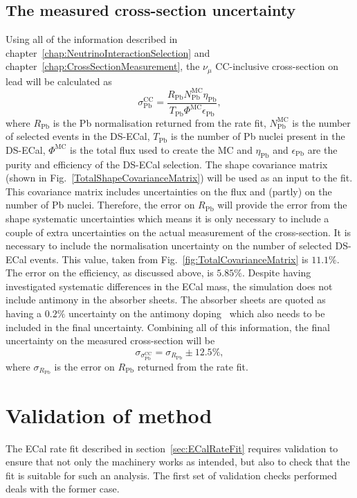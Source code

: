 \subsection{The measured cross-section uncertainty}
Using all of the information described in chapter~\ref{chap:NeutrinoInteractionSelection} and chapter~\ref{chap:CrossSectionMeasurement}, the $\nu_\mu$ CC-inclusive cross-section on lead will be calculated as
\begin{equation}
\label{eq:CrossSection}
\sigma^{\textrm{CC}}_{\textrm{Pb}} = \frac{R_{\textrm{Pb}}N^{\textrm{MC}}_{\textrm{Pb}}\eta_{\textrm{Pb}}}{T_{\textrm{Pb}}\Phi^{\textrm{MC}}\epsilon_{\textrm{Pb}}},
\end{equation}
where $R_{\textrm{Pb}}$ is the Pb normalisation returned from the rate fit, $N^{\textrm{MC}}_{\textrm{Pb}}$ is the number of selected events in the DS-ECal, $T_{\textrm{Pb}}$ is the number of Pb nuclei present in the DS-ECal, $\Phi^{\textrm{MC}}$ is the total flux used to create the MC and $\eta_{\textrm{Pb}}$ and $\epsilon_{\textrm{Pb}}$ are the purity and efficiency of the DS-ECal selection.  The shape covariance matrix (shown in Fig.~\ref{TotalShapeCovarianceMatrix}) will be used as an input to the fit.  This covariance matrix includes uncertainties on the flux and (partly) on the number of Pb nuclei.  Therefore, the error on $R_{\textrm{Pb}}$ will provide the error from the shape systematic uncertainties which means it is only necessary to include a couple of extra uncertainties on the actual measurement of the cross-section.  It is necessary to include the normalisation uncertainty on the number of selected DS-ECal events.  This value, taken from Fig.~\ref{fig:TotalCovarianceMatrix} is $11.1\%$.  The error on the efficiency, as discussed above, is $5.85\%$. Despite having investigated systematic differences in the ECal mass, the simulation does not include antimony in the absorber sheets.  The absorber sheets are quoted as having a $0.2\%$ uncertainty on the antimony doping~\cite{1748-0221-8-10-P10019} which also needs to be included in the final uncertainty.  Combining all of this information, the final uncertainty on the measured cross-section will be
\begin{equation}
\label{eq:CrossSectionUncertainty}
\sigma_{\sigma^{\textrm{CC}}_{\textrm{Pb}}} = \sigma_{R_{\textrm{Pb}}} \pm 12.5\%,
\end{equation}
where $\sigma_{R_{\textrm{Pb}}}$ is the error on $R_{\textrm{Pb}}$ returned from the rate fit.

\section{Validation of method}
\label{sec:MethodValidation}
The ECal rate fit described in section~\ref{sec:ECalRateFit} requires validation to ensure that not only the machinery works as intended, but also to check that the fit is suitable for such an analysis.  The first set of validation checks performed deals with the former case.

